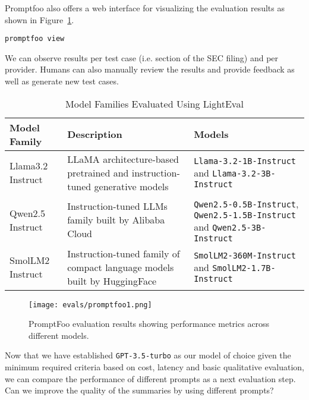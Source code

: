 Promptfoo also offers a web interface for visualizing the evaluation results as shown in Figure~\ref{fig:promptfoo1}. 

\begin{verbatim}
promptfoo view
\end{verbatim}

We can observe results per test case (i.e. section of the SEC filing) and per provider. Humans can also manually review the results and provide feedback as well as generate new test cases.



\begin{table*}[h]
    \begin{tabular}{lll}
    \hline
    Model Family & Description & Models \\
    \hline
    Llama3.2 Instruct \cite{meta_llama_models} & LLaMA architecture-based \newline pretrained and instruction-tuned \newline generative models & \texttt{Llama-3.2-1B-Instruct} and 
    \texttt{Llama-3.2-3B-Instruct} \\
    \hline
    Qwen2.5 Instruct \cite{gpt2docs,hui2024qwen2,qwen2} & Instruction-tuned LLMs family \newline built by Alibaba Cloud & \texttt{Qwen2.5-0.5B-Instruct}, \texttt{Qwen2.5-1.5B-Instruct} and \texttt{Qwen2.5-3B-Instruct} \\
    \hline
    SmolLM2 Instruct \cite{allal2024SmolLM2}  & Instruction-tuned family of \newline compact language models \newline built by HuggingFace & \texttt{SmolLM2-360M-Instruct} and \texttt{SmolLM2-1.7B-Instruct} \\
    \hline
    \end{tabular}
    \caption{Model Families Evaluated Using LightEval}
    \label{tab:model-families}
    \end{table*}



\begin{figure}[h]
\centering
\texttt{[image: evals/promptfoo1.png]}
\caption{PromptFoo evaluation results showing performance metrics across different models.}
\label{fig:promptfoo1}
\end{figure}

Now that we have established \texttt{GPT-3.5-turbo} as our model of choice given the minimum required criteria based on cost, latency and basic qualitative evaluation, we can compare the performance of different prompts as a next evaluation step. Can we improve the quality of the summaries by using different prompts?

